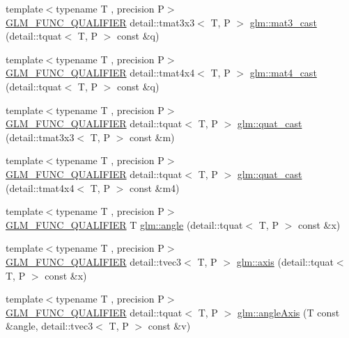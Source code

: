 \begin{DoxyCompactItemize}
\item 
{\footnotesize template$<$typename T , precision P$>$ }\\\hyperlink{setup_8hpp_a33fdea6f91c5f834105f7415e2a64407}{G\+L\+M\+\_\+\+F\+U\+N\+C\+\_\+\+Q\+U\+A\+L\+I\+F\+I\+ER} detail\+::tmat3x3$<$ T, P $>$ \hyperlink{group__gtc__quaternion_ga65257c3494022ad80a50ce11da95049d}{glm\+::mat3\+\_\+cast} (detail\+::tquat$<$ T, P $>$ const \&q)
\item 
{\footnotesize template$<$typename T , precision P$>$ }\\\hyperlink{setup_8hpp_a33fdea6f91c5f834105f7415e2a64407}{G\+L\+M\+\_\+\+F\+U\+N\+C\+\_\+\+Q\+U\+A\+L\+I\+F\+I\+ER} detail\+::tmat4x4$<$ T, P $>$ \hyperlink{group__gtc__quaternion_gafc4e34c836f7ccb5f3bb2a0373c831e0}{glm\+::mat4\+\_\+cast} (detail\+::tquat$<$ T, P $>$ const \&q)
\item 
{\footnotesize template$<$typename T , precision P$>$ }\\\hyperlink{setup_8hpp_a33fdea6f91c5f834105f7415e2a64407}{G\+L\+M\+\_\+\+F\+U\+N\+C\+\_\+\+Q\+U\+A\+L\+I\+F\+I\+ER} detail\+::tquat$<$ T, P $>$ \hyperlink{group__gtc__quaternion_gafb826745dedb1760100bbd25d0f63fde}{glm\+::quat\+\_\+cast} (detail\+::tmat3x3$<$ T, P $>$ const \&m)
\item 
{\footnotesize template$<$typename T , precision P$>$ }\\\hyperlink{setup_8hpp_a33fdea6f91c5f834105f7415e2a64407}{G\+L\+M\+\_\+\+F\+U\+N\+C\+\_\+\+Q\+U\+A\+L\+I\+F\+I\+ER} detail\+::tquat$<$ T, P $>$ \hyperlink{group__gtc__quaternion_ga385af22ef1a45c4464ddd28b80d5ce18}{glm\+::quat\+\_\+cast} (detail\+::tmat4x4$<$ T, P $>$ const \&m4)
\item 
{\footnotesize template$<$typename T , precision P$>$ }\\\hyperlink{setup_8hpp_a33fdea6f91c5f834105f7415e2a64407}{G\+L\+M\+\_\+\+F\+U\+N\+C\+\_\+\+Q\+U\+A\+L\+I\+F\+I\+ER} T \hyperlink{group__gtc__quaternion_ga23a3fc7ada5bbb665ff84c92c6e0542c}{glm\+::angle} (detail\+::tquat$<$ T, P $>$ const \&x)
\item 
{\footnotesize template$<$typename T , precision P$>$ }\\\hyperlink{setup_8hpp_a33fdea6f91c5f834105f7415e2a64407}{G\+L\+M\+\_\+\+F\+U\+N\+C\+\_\+\+Q\+U\+A\+L\+I\+F\+I\+ER} detail\+::tvec3$<$ T, P $>$ \hyperlink{group__gtc__quaternion_ga8eef9f8c3f2e4836dccf09df975b20fb}{glm\+::axis} (detail\+::tquat$<$ T, P $>$ const \&x)
\item 
{\footnotesize template$<$typename T , precision P$>$ }\\\hyperlink{setup_8hpp_a33fdea6f91c5f834105f7415e2a64407}{G\+L\+M\+\_\+\+F\+U\+N\+C\+\_\+\+Q\+U\+A\+L\+I\+F\+I\+ER} detail\+::tquat$<$ T, P $>$ \hyperlink{group__gtc__quaternion_ga771b3e16cca8324e7111b923476be666}{glm\+::angle\+Axis} (T const \&angle, detail\+::tvec3$<$ T, P $>$ const \&v)

\end{DoxyCompactItemize}
